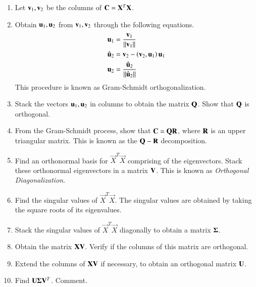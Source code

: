\renewcommand{\theequation}{\theenumi}
\begin{enumerate}[label=\arabic*.,ref=\thesubsection.\theenumi]
\item Let $\mathbf{v}_1,\mathbf{v}_2$ be the columns of $\mathbf{C} = \mathbf{X}^T\mathbf{X}$.

\item
	Obtain $\mathbf{u}_1,\mathbf{u}_2$ from $\mathbf{v}_1,\mathbf{v}_2$ through the following equations. 
\begin{align}
\mathbf{u}_1&= \frac{\mathbf{v}_1}{\left\lVert\mathbf{v}_1\right\rVert}
\\
\hat{\mathbf{u}}_2 &= \mathbf{v}_2 - \left(\mathbf{v}_2,\mathbf{u}_1\right)\mathbf{u}_1
\\
\mathbf{u}_2 &= \frac{\hat{\mathbf{u}}_2}{\left\lVert\hat{\mathbf{u}}_2\right\rVert}
\end{align}
	This procedure is known as Gram-Schmidt orthogonalization.


\item
Stack the vectors $\mathbf{u}_1,\mathbf{u}_2$ in columns to obtain the matrix $\mathbf{Q}$.  Show that $\mathbf{Q}$ is orthogonal.  


\item
	From the Gram-Schmidt process, show that $\mathbf{C}=\mathbf{Q}\mathbf{R}$, where $\mathbf{R}$ is an upper triangular matrix.  This is known as the $\mathbf{Q}-\mathbf{R}$ decomposition.  


\item
	Find an orthonormal basis for $\vec{X}^T\vec{X}$ comprising of the eigenvectors.  Stack these orthonormal eigenvectors in a matrix $\mathbf{V}$. This is known as {\em Orthogonal Diagonalization}.  

\item
	Find the singular values of $\vec{X}^T\vec{X}$.  The singular values are obtained by taking the square roots of its eigenvalues.  

\item
	Stack the singular values of $\vec{X}^T\vec{X}$ diagonally to obtain a matrix $\mathbf{\Sigma}$.


\item
	Obtain the matrix $\mathbf{X}\mathbf{V}$.  Verify if the columns of this matrix are orthogonal.


\item
	Extend the columns of $\mathbf{X}\mathbf{V}$ if necessary, to obtain an orthogonal matrix $\mathbf{U}$.


\item
	Find $\mathbf{U}\mathbf{\Sigma}\mathbf{V}^T$.  Comment.


\end{enumerate}

